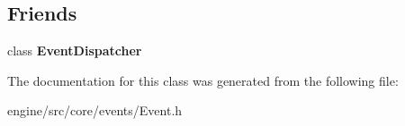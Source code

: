 \subsection*{Friends}
\begin{DoxyCompactItemize}
\item 
\mbox{\label{classengine_1_1events_1_1Event_aad5f38ccd490ea17008460423f52325a}} 
class {\bfseries Event\+Dispatcher}
\end{DoxyCompactItemize}


The documentation for this class was generated from the following file\+:\begin{DoxyCompactItemize}
\item 
engine/src/core/events/Event.\+h\end{DoxyCompactItemize}
